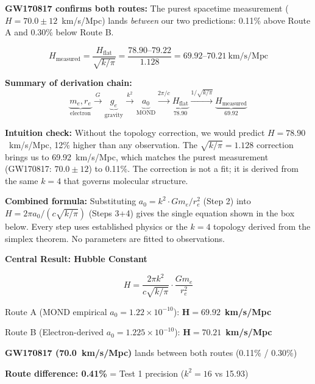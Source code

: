 \documentclass[aps,prd,preprint,superscriptaddress,showpacs,preprintnumbers,amsmath,amssymb,nofootinbib]{revtex4-2}
\begin{document}
\textbf{GW170817 confirms both routes:} The purest spacetime measurement ($H = 70.0 \pm 12$~km/s/Mpc) lands \emph{between} our two predictions: 0.11\% above Route A and 0.30\% below Route B.

\begin{equation}
H_{\text{measured}} = \frac{H_{\text{flat}}}{\sqrt{k/\pi}} = \frac{78.90\text{--}79.22}{1.128} = 69.92\text{--}70.21~\text{km/s/Mpc}
\label{eq:hcorrected}
\end{equation}

\textbf{Summary of derivation chain:}
\begin{equation}
\underbrace{m_e, r_e}_{\text{electron}} \xrightarrow{G} \underbrace{g_e}_{\text{gravity}} \xrightarrow{k^2} \underbrace{a_0}_{\text{MOND}} \xrightarrow{2\pi/c} \underbrace{H_{\text{flat}}}_{\text{78.90}} \xrightarrow{1/\sqrt{k/\pi}} \underbrace{H_{\text{measured}}}_{\text{69.92}}
\end{equation}

\textbf{Intuition check:} Without the topology correction, we would predict $H = 78.90$~km/s/Mpc, 12\% higher than any observation. The $\sqrt{k/\pi} = 1.128$ correction brings us to 69.92~km/s/Mpc, which matches the purest measurement (GW170817: $70.0 \pm 12$) to 0.11\%. The correction is not a fit; it is derived from the same $k=4$ that governs molecular structure.

\textbf{Combined formula:} Substituting $a_0 = k^2 \cdot Gm_e/r_e^2$ (Step 2) into $H = 2\pi a_0/(c\sqrt{k/\pi})$ (Steps 3+4) gives the single equation shown in the box below. Every step uses established physics or the $k=4$ topology derived from the simplex theorem. No parameters are fitted to observations.

\vspace{1.5em}
\noindent
\colorbox{resultgreen}{\parbox{\dimexpr\textwidth-2\fboxsep\relax}{%
\vspace{0.8em}
\centering
\textbf{\large Central Result: Hubble Constant}

\vspace{0.5em}
\boldmath
\begin{equation}
H = \frac{2\pi k^2}{c\sqrt{k/\pi}} \cdot \frac{Gm_e}{r_e^2}
\label{eq:hubble}
\end{equation}
\unboldmath

\vspace{0.3em}
Route A (MOND empirical $a_0 = 1.22 \times 10^{-10}$): $\bm{H = 69.92}$~\textbf{km/s/Mpc}

Route B (Electron-derived $a_0 = 1.225 \times 10^{-10}$): $\bm{H = 70.21}$~\textbf{km/s/Mpc}

\textbf{GW170817 (70.0~km/s/Mpc)} lands between both routes (0.11\% / 0.30\%)

\vspace{0.3em}
\textbf{Route difference: 0.41\%} = Test 1 precision ($k^2 = 16$ vs 15.93)
\vspace{0.5em}
}}
\end{document}
